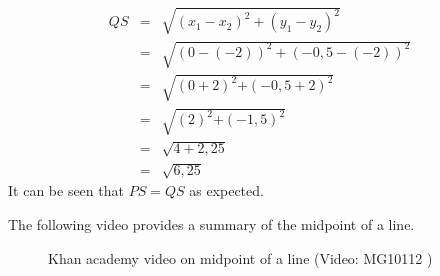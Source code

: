     \begin{eqnarray*}
QS & = & \sqrt{{({x}_{1} - {x}_{2})}^{2} + {({y}_{1} - {y}_{2})}^{2}} \\ 
& = & \sqrt{{(0 - (-2))}^{2} + {(-0,5 - (-2))}^{2}} \\ 
& = & \sqrt{{(0 + 2)}^{2}{+(-0,5 + 2)}^{2}} \\ 
& = & \sqrt{{(2)}^{2}{+(-1,5)}^{2}} \\ 
& = & \sqrt{4 + 2,25} \\ 
& = & \sqrt{6,25}
      \end{eqnarray*}
        \label{m39119*id69633}It can be seen that $PS=QS$ as expected.\par 
    \setcounter{subfigure}{0}
 	\begin{figure}[H] %
    \begin{center}
    \end{center}
 \end{figure} 
       \label{m39119*eip-891}The following video provides a summary of the midpoint of a line.
    \setcounter{subfigure}{0}
	\begin{figure}[H] %
    \textnormal{Khan academy video on midpoint of a line}\vspace{.1in} \nopagebreak
  \label{m39119*yt-media2}\label{m39119*yt-video2}
             { (Video:  MG10112 )}
      \vspace{2pt}
    \vspace{.1in}
 \end{figure}       \par \label{m39119**end}
